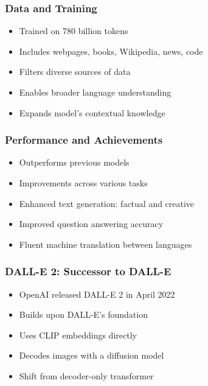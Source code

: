 \begin{frame}[fragile]\frametitle{Data and Training}
    
    \begin{itemize}
        \item Trained on 780 billion tokens
        \item Includes webpages, books, Wikipedia, news, code
        \item Filters diverse sources of data
        \item Enables broader language understanding
        \item Expands model's contextual knowledge
    \end{itemize}
\end{frame}

\begin{frame}[fragile]\frametitle{Performance and Achievements}
    
    \begin{itemize}
        \item Outperforms previous models
        \item Improvements across various tasks
        \item Enhanced text generation: factual and creative
        \item Improved question answering accuracy
        \item Fluent machine translation between languages
    \end{itemize}
\end{frame}

\begin{frame}[fragile]\frametitle{DALL-E 2: Successor to DALL-E}
    
    \begin{itemize}
        \item OpenAI released DALL-E 2 in April 2022
        \item Builds upon DALL-E's foundation
        \item Uses CLIP embeddings directly
        \item Decodes images with a diffusion model
        \item Shift from decoder-only transformer
    \end{itemize}
\end{frame}


